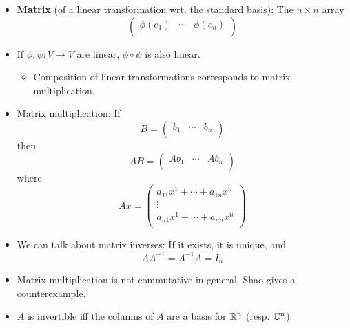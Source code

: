 \documentclass[../notes.tex]{subfiles}
\begin{document}
\begin{itemize}
    \item \textbf{Matrix} (of a linear transformation wrt. the standard basis): The $n\times n$ array
    \begin{equation*}
        \begin{pmatrix}
            \phi(e_1) & \cdots & \phi(e_n)\\
        \end{pmatrix}
    \end{equation*}
    \item If $\phi,\psi:V\to V$ are linear, $\phi\circ\psi$ is also linear.
    \begin{itemize}
        \item Composition of linear transformations corresponds to matrix multiplication.
    \end{itemize}
    \item Matrix multiplication: If
    \begin{equation*}
        B =
        \begin{pmatrix}
            b_1 & \cdots & b_n\\
        \end{pmatrix}
    \end{equation*}
    then
    \begin{equation*}
        AB =
        \begin{pmatrix}
            Ab_1 & \cdots & Ab_n\\
        \end{pmatrix}
    \end{equation*}
    where
    \begin{equation*}
        Ax =
        \begin{pmatrix}
            a_{11}x^1+\cdots+a_{1n}x^n\\
            \vdots\\
            a_{n1}x^1+\cdots+a_{nn}x^n\\
        \end{pmatrix}
    \end{equation*}
    \item We can talk about matrix inverses: If it exists, it is unique, and
    \begin{equation*}
        AA^{-1} = A^{-1}A = I_n
    \end{equation*}
    \item Matrix multiplication is not commutative in general. Shao gives a counterexample.
    \item $A$ is invertible iff the columns of $A$ are a basis for $\mathbb{R}^n$ (resp. $\mathbb{C}^n$).

\end{itemize}
\end{document}
